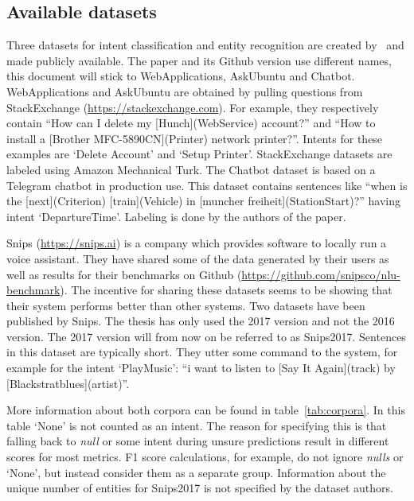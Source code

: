 \subsection{Available datasets}
\label{subsec:available_datasets}
Three datasets for intent classification and entity recognition are created by~\citet{braun2017} and made publicly available.
The paper and its Github version use different names, this document will stick to WebApplications, AskUbuntu and Chatbot.
WebApplications and AskUbuntu are obtained by pulling questions from StackExchange (\url{https://stackexchange.com}).
For example, they respectively contain ``How can I delete my [Hunch](WebService) account?'' and ``How to install a [Brother MFC-5890CN](Printer) network printer?''.
Intents for these examples are `Delete Account' and `Setup Printer'.
StackExchange datasets are labeled using Amazon Mechanical Turk.
The Chatbot dataset is based on a Telegram chatbot in production use.
This dataset contains sentences like ``when is the [next](Criterion) [train](Vehicle) in [muncher freiheit](StationStart)?'' having intent `DepartureTime'.
Labeling is done by the authors of the paper.

Snips (\url{https://snips.ai}) is a company which provides software to locally run a voice assistant.
They have shared some of the data generated by their users as well as results for their benchmarks on Github (\url{https://github.com/snipsco/nlu-benchmark}).
The incentive for sharing these datasets seems to be showing that their system performs better than other systems.
Two datasets have been published by Snips.
The thesis has only used the 2017 version and not the 2016 version.
The 2017 version will from now on be referred to as Snips2017.
Sentences in this dataset are typically short.
They utter some command to the system, for example for the intent `PlayMusic': ``i want to listen to [Say It Again](track) by [Blackstratblues](artist)''.

More information about both corpora can be found in table~\ref{tab:corpora}.
In this table `None' is not counted as an intent.
The reason for specifying this is that falling back to \textit{null} or some intent during unsure predictions result in different scores for most metrics.
F1 score calculations, for example, do not ignore \textit{nulls} or `None', but instead consider them as a separate group.
Information about the unique number of entities for Snips2017 is not specified by the dataset authors.

